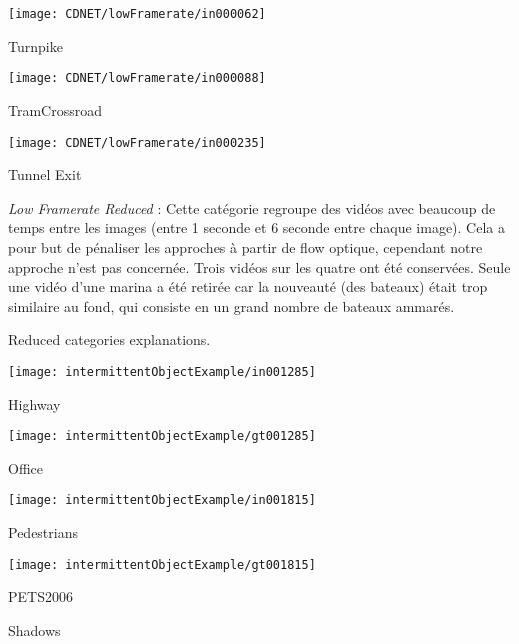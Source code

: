 	\begin{figureth}
		\begin{subfigureth}{0.24\textwidth}
			\texttt{[image: CDNET/lowFramerate/in000062]}\caption{Turnpike}	
		\end{subfigureth}
		\begin{subfigureth}{0.24\textwidth}
			\texttt{[image: CDNET/lowFramerate/in000088]}\caption{TramCrossroad}	
		\end{subfigureth}
		\begin{subfigureth}{0.24\textwidth}
			\texttt{[image: CDNET/lowFramerate/in000235]}\caption{Tunnel Exit}	
		\end{subfigureth}
		\caption[Categorie low framerate - Reduced]{\textit{Low Framerate Reduced} : Cette catégorie regroupe des vidéos avec beaucoup de temps entre les images (entre 1 seconde et 6 seconde entre chaque image). Cela a pour but de pénaliser les approches à partir de flow optique, cependant notre approche n'est pas concernée. Trois vidéos sur les quatre ont été conservées. Seule une vidéo d'une marina a été retirée car la nouveauté (des bateaux) était trop similaire au fond, qui consiste en un grand nombre de bateaux ammarés.}\label{fig:cdnet:fps}
	\end{figureth}


	Reduced categories explanations.

	\begin{figureth}
		\begin{subfigureth}{0.24\textwidth}
			\texttt{[image: intermittentObjectExample/in001285]}\caption{Highway}	
		\end{subfigureth}
		\begin{subfigureth}{0.24\textwidth}
			\texttt{[image: intermittentObjectExample/gt001285]}\caption{Office}	
		\end{subfigureth}
		\begin{subfigureth}{0.24\textwidth}
			\texttt{[image: intermittentObjectExample/in001815]}\caption{Pedestrians}	
		\end{subfigureth}
		\begin{subfigureth}{0.24\textwidth}
			\texttt{[image: intermittentObjectExample/gt001815]}\caption{PETS2006}	
		\end{subfigureth}
		\caption[camera jitter category]{Shadows}\label{fig:cdnet:shadow}
	\end{figureth}

